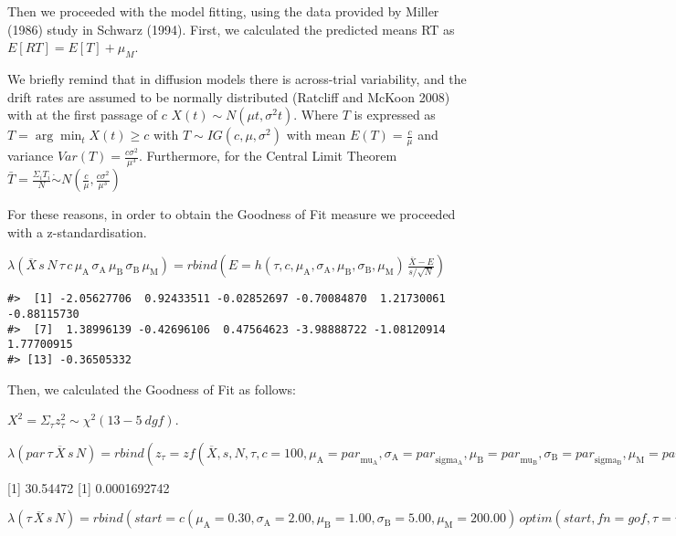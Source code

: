 Then we proceeded with the model fitting, using the data provided by Miller (1986) study in Schwarz (1994). First, we calculated the predicted means RT as \(E[RT]=E[T]+\mu_M\).

We briefly remind that in diffusion models there is across-trial variability, and the drift rates are assumed to be normally distributed (Ratcliff and McKoon 2008) with at the first passage of \(c\) \(X(t) \sim N(\mu t , \sigma^2 t)\). Where \(T\) is expressed as \(T= \arg \min_t X(t)\geq c\) with \(T \sim IG (c, \mu, \sigma^2)\) with mean \(E(T)=\displaystyle \frac{c}{\mu}\) and variance \(Var(T)=\displaystyle \frac{c\sigma^2}{\mu^3}\). Furthermore, for the Central Limit Theorem \(\bar{T} = \displaystyle \frac{\Sigma_iT_i}{N} \dot\sim N (\displaystyle \frac{c}{\mu} , \displaystyle \frac{c\sigma^2}{\mu^3})\)

For these reasons, in order to obtain the Goodness of Fit measure we proceeded with a z-standardisation.

\({{\lambda\left({\overline{{X}}{\,{s}{\,{N}{\,\tau{\,{c}{\,{\mu_\mathrm{A}}{\,{\sigma_\mathrm{A}}{\,{\mu_\mathrm{B}}{\,{\sigma_\mathrm{B}}{\,{\mu_\mathrm{M}}}}}}}}}}}}\right)}={{rbind}\left({{{E}={{h}\left({\tau{,{c}{,{\mu_\mathrm{A}}{,{\sigma_\mathrm{A}}{,{\mu_\mathrm{B}}{,{\sigma_\mathrm{B}}{,{\mu_\mathrm{M}}}}}}}}}\right)}}{\,\displaystyle{\frac{{\overline{{X}}-{E}}}{{{s}/\sqrt{{N}}}}}}}\right)}}\)

\begin{verbatim}
#>  [1] -2.05627706  0.92433511 -0.02852697 -0.70084870  1.21730061 -0.88115730
#>  [7]  1.38996139 -0.42696106  0.47564623 -3.98888722 -1.08120914  1.77700915
#> [13] -0.36505332
\end{verbatim}

Then, we calculated the Goodness of Fit as follows:

\(X^2=\Sigma_\tau z^2_\tau \sim\chi^2(13-5\  dgf)\).

\({{\lambda\left({{par}{\,\tau{\,\overline{{X}}{\,{s}{\,{N}}}}}}\right)}={{rbind}\left({{{{z}_\tau}={{zf}\left({\overline{{X}}{,{s}{,{N}{,\tau{,{{c}={100}}{,{{\mu_\mathrm{A}}={{par}_\mathrm{mu_A}}}{,{{\sigma_\mathrm{A}}={{par}_\mathrm{sigma_A}}}{,{{\mu_\mathrm{B}}={{par}_\mathrm{mu_B}}}{,{{\sigma_\mathrm{B}}={{par}_\mathrm{sigma_B}}}{,{{\mu_\mathrm{M}}={{par}_\mathrm{mu_M}}}}}}}}}}}}}\right)}}{\,{{\sum}{{z}_\tau^{2}}}}}\right)}}\)

{[}1{]} 30.54472
{[}1{]} 0.0001692742

\({{\lambda\left({\tau{\,\overline{{X}}{\,{s}{\,{N}}}}}\right)}={{rbind}\left({{{start}={{c}\left({{{\mu_\mathrm{A}}={0.30}}{,{{\sigma_\mathrm{A}}={2.00}}{,{{\mu_\mathrm{B}}={1.00}}{,{{\sigma_\mathrm{B}}={5.00}}{,{{\mu_\mathrm{M}}={200.00}}}}}}}\right)}}{\,{{optim}\left({{start}{,{{fn}={gof}}{,{\tau=\tau}{,{\overline{{X}}=\overline{{X}}}{,{{s}={s}}{,{{N}={N}}{,{{hessian}={true}}{,{{control}={{list}\left({{fnscale}={1.00}}\right)}}}}}}}}}}\right)}}}\right)}}\)

